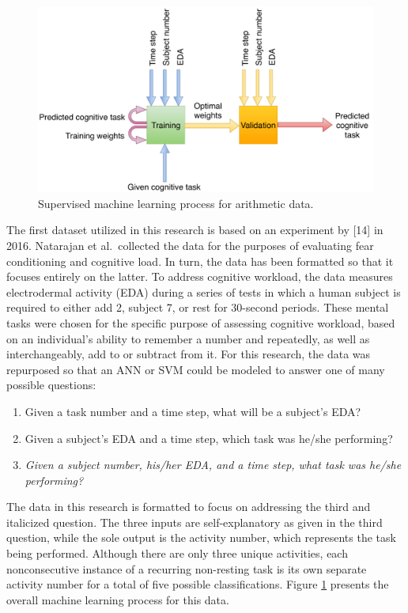 \documentclass[12pt]{uthesis-v12}  %
\begin{document}
\begin{figure}[!t]
\centering
\includegraphics[width=5in]{nata-io}
\caption{Supervised machine learning process for arithmetic data.}
\label{nata-io}
\end{figure}

The first dataset utilized in this research is based on an experiment by [14] in 2016. Natarajan et al.~collected the data for the purposes of evaluating fear conditioning and cognitive load. In turn, the data has been formatted so that it focuses entirely on the latter. To address cognitive workload, the data measures electrodermal activity (EDA) during a series of tests in which a human subject is required to either add 2, subject 7, or rest for 30-second periods. These mental tasks were chosen for the specific purpose of assessing cognitive workload, based on an individual's ability to remember a number and repeatedly, as well as interchangeably, add to or subtract from it. For this research, the data was repurposed so that an ANN or SVM could be modeled to answer one of many possible questions: 

\begin{enumerate}
	\item Given a task number and a time step, what will be a subject's EDA? 
	\item Given a subject's EDA and a time step, which task was he/she performing?
	\item \textit{Given a subject number, his/her EDA, and a time step, what task was he/she performing?}
\end{enumerate} 

The data in this research is formatted to focus on addressing the third and italicized question. The three inputs are self-explanatory as given in the third question, while the sole output is the activity number, which represents the task being performed. Although there are only three unique activities, each nonconsecutive instance of a recurring non-resting task is its own separate activity number for a total of five possible classifications. Figure \ref{nata-io} presents the overall machine learning process for this data.
\end{document}

